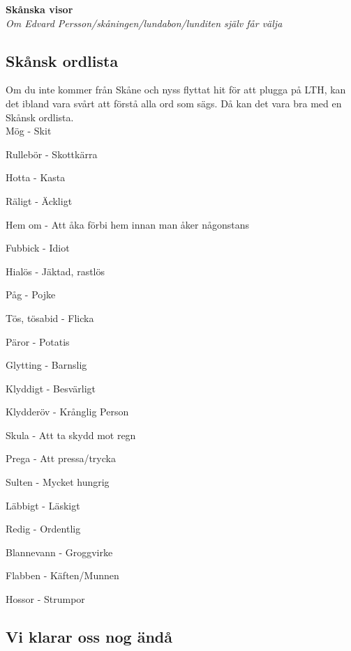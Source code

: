 \begin{center}
    \vspace*{1.5cm}
    {\fontsize{20}{20}\textbf{Skånska visor}}\\
    \vspace{0.7cm}
    {\fontsize{12}{12}\textit{Om Edvard Persson/skåningen/lundabon/lunditen själv får välja}}
\end{center}
\noBackground

\newpage
\resetBackground



\subsection*{Skånsk ordlista}

Om du inte kommer från Skåne och nyss flyttat hit för att plugga på LTH, 
kan det ibland vara svårt att förstå alla ord som sägs. Då kan det vara bra
med en Skånsk ordlista. \\



Mög - Skit

Rullebör - Skottkärra

Hotta - Kasta

Räligt - Äckligt

Hem om - Att åka förbi hem innan man åker någonstans

Fubbick - Idiot

Hialös - Jäktad, rastlös

Påg - Pojke

Tös, tösabid - Flicka

Päror - Potatis

Glytting - Barnslig

Klyddigt - Besvärligt

Klydderöv - Krånglig Person

Skula - Att ta skydd mot regn

Prega - Att pressa/trycka

Sulten - Mycket hungrig

Läbbigt - Läskigt

Redig - Ordentlig

Blannevann - Groggvirke

Flabben - Käften/Munnen

Hossor - Strumpor


\newpage


\subsection*{Vi klarar oss nog ändå} 

